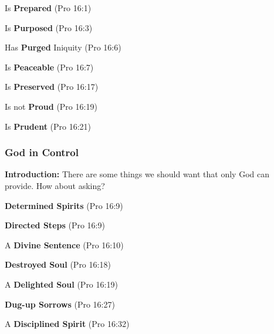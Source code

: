 \begin{compactenum}[I.][8]
    \item Is \textbf{Prepared}   (Pro 16:1)
    \item Is \textbf{Purposed}   (Pro 16:3)
    \item Has \textbf{Purged} Iniquity   (Pro 16:6)
    \item Is \textbf{Peaceable}    (Pro 16:7)
    \item Is \textbf{Preserved}    (Pro 16:17)
    \item Is not \textbf{Proud}    (Pro 16:19)
    \item Is \textbf{Prudent}    (Pro 16:21)
\end{compactenum}

\subsubsection{God in Control}
\textbf{Introduction: } There are some things we should want that only God can provide.  How about asking?%
\begin{compactenum}[I.][8]
	\item \textbf{Determined Spirits}  (Pro 16:9)
	\item \textbf{Directed Steps}   (Pro 16:9)
	\item A \textbf{Divine Sentence}    (Pro 16:10)
	\item \textbf{Destroyed Soul}    (Pro 16:18)
	\item A \textbf{Delighted Soul}    (Pro 16:19)
	\item \textbf{Dug-up Sorrows}   (Pro 16:27)
	\item A \textbf{Disciplined Spirit}   (Pro 16:32)
\end{compactenum}


